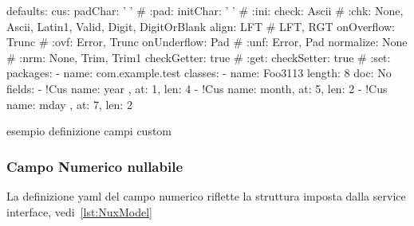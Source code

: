 \documentclass[a4paper,10pt]{report}
\newif\ifesource
\newenvironment{elisting}[1][!htb]
  {\captionsetup{aboveskip=0pt}\begin{listing}[#1]}
  {\end{listing}%
}
\begin{document}
\ifesource
\begin{figure*}[!htb]
\begin{lstlisting}[language=yaml, caption={esempio definizione campi custom}, 
label=lst:xmplCus]
defaults:
  cus:
    padChar: ' '        # :pad:
    initChar: ' '       # :ini:
    check: Ascii        # :chk: None, Ascii, Latin1, Valid, Digit, DigitOrBlank
    align: LFT          # LFT, RGT
    onOverflow: Trunc   # :ovf: Error, Trunc
    onUnderflow: Pad    # :unf: Error, Pad
    normalize: None     # :nrm: None, Trim, Trim1
    checkGetter: true   # :get:
    checkSetter: true   # :set:
packages:
  - name: com.example.test
    classes:
      - name: Foo3113
        length: 8
        doc: No
        fields:
          - !Cus { name: year , at: 1, len: 4 }
          - !Cus { name: month, at: 5, len: 2 }
          - !Cus { name: mday , at: 7, len: 2 }
\end{lstlisting}
\end{figure*}
\else
\begin{elisting}
\begin{yamlcode}
defaults:
  cus:
    padChar: ' '        # :pad:
    initChar: ' '       # :ini:
    check: Ascii        # :chk: None, Ascii, Latin1, Valid, Digit, DigitOrBlank
    align: LFT          # LFT, RGT
    onOverflow: Trunc   # :ovf: Error, Trunc
    onUnderflow: Pad    # :unf: Error, Pad
    normalize: None     # :nrm: None, Trim, Trim1
    checkGetter: true   # :get:
    checkSetter: true   # :set:
packages:
  - name: com.example.test
    classes:
      - name: Foo3113
        length: 8
        doc: No
        fields:
          - !Cus { name: year , at: 1, len: 4 }
          - !Cus { name: month, at: 5, len: 2 }
          - !Cus { name: mday , at: 7, len: 2 }
\end{yamlcode}
\caption{esempio definizione campi custom}
\label{lst:xmplCus}
\end{elisting}
\fi


\subsubsection{Campo Numerico nullabile} \label{sub:yaml.nux}
La definizione yaml del campo numerico riflette la struttura imposta dalla
service interface, vedi~\ref{lst:NuxModel}
\end{document}
